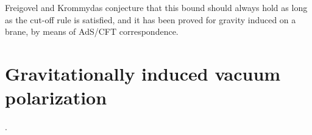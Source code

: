 Freigovel and Krommydas conjecture that this bound should always hold as long as the cut-off rule is satisfied, and it has been proved for gravity induced on a brane, by means of AdS/CFT correspondence.
	
\section{Gravitationally induced vacuum polarization}
.
	
	
	

	
	
	
	
	



